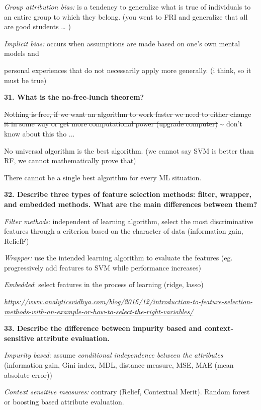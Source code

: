 \textit{Group attribution bias:} is a tendency to generalize what is
true of individuals to an entire group to which they belong. (you went
to FRI and generalize that all are good students \ldots{} )

\textit{Implicit bias:} occurs when assumptions are made based on
one's own mental models and

personal experiences that do not necessarily apply more generally. (i
think, so it must be true)

\textbf{31. What is the no-free-lunch theorem?}

\sout{Nothing is free, if we want an algorithm to work faster we need to
either change it in some way or get more computational power (upgrade
computer)} \textasciitilde{} don't know about this tho ...

No universal algorithm is the best algorithm. (we cannot say SVM is
better than RF, we cannot mathematically prove that)

There cannot be a single best algorithm for every ML situation.

\textbf{32. Describe three types of feature selection methods: filter,
wrapper, and embedded methods. What are the main differences between
them?}

\textit{Filter methods}: independent of learning algorithm, select
the most discriminative features through a criterion based on the
character of data (information gain, ReliefF)

\textit{Wrapper:} use the intended learning algorithm to evaluate the
features (eg. progressively add features to SVM while performance
increases)

\textit{Embedded}: select features in the process of learning (ridge,
lasso)

\href{https://www.analyticsvidhya.com/blog/2016/12/introduction-to-feature-selection-methods-with-an-example-or-how-to-select-the-right-variables/}{\textit{https://www.analyticsvidhya.com/blog/2016/12/introduction-to-feature-selection-methods-with-an-example-or-how-to-select-the-right-variables/}}

\textbf{33. Describe the difference between impurity based and
context-sensitive attribute evaluation.}

\textit{Impurity based}: assume \emph{conditional independence
between the attributes} (information gain, Gini index, MDL, distance
measure, MSE, MAE (mean absolute error))

\textit{Context sensitive measures:} contrary (Relief, Contextual
Merit). Random forest or boosting based attribute evaluation.

